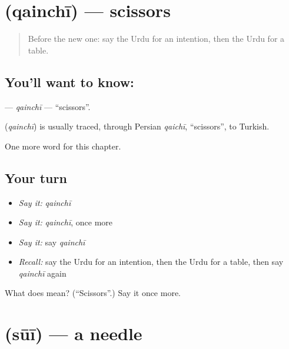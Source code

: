 \section[\texorpdfstring{\ur{قینچی} (qainchī)}{قینچی (qainchī)}]{ (qainchī) — scissors}

\label{lesson:UR-C105-qainchi}



\begin{quote}
Before the new one: say the Urdu for an intention, then the Urdu for a table.
\end{quote}

\subsection*{You'll want to know: }
\textbf{} — \emph{qainchī} — \textquotedblleft{}scissors\textquotedblright{}.

\begin{cousinweb}
\textbf{} (\emph{qainchī}) is usually traced, through Persian \emph{qaichī}, \textquotedblleft{}scissors\textquotedblright{}, to Turkish.
\end{cousinweb}

\begin{grammarlens}[title={What you've built}]
One more word for this chapter.
\end{grammarlens}

\subsection*{Your turn}
\begin{itemize}
\raggedright
  \item \emph{Say it:} \emph{qainchī}
  \item \emph{Say it:} \emph{qainchī}, once more
  \item \emph{Say it:} say \emph{qainchī}
  \item \emph{Recall:} say the Urdu for an intention, then the Urdu for a table, then say \emph{qainchī} again
\end{itemize}

\begin{tcolorbox}[breakable,colback=teal!4,colframe=teal!35!black,title={Before you move on}]
What does  mean? (\textquotedblleft{}Scissors\textquotedblright{}.) Say it once more.
\end{tcolorbox}
\section[\texorpdfstring{\ur{سوئی} (sūī)}{سوئی (sūī)}]{ (sūī) — a needle}

